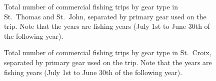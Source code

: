 \documentclass[
  letterpaper,
  oneside,
  open=any]{scrbook}
\begin{document}
\begin{figure}


\caption{\label{fig-gearSTT}Total number of commercial fishing trips by
gear type in St.~Thomas and St.~John, separated by primary gear used on
the trip. Note that the years are fishing years (July 1st to June 30th
of the following year).}

\end{figure}%

\begin{figure}


\caption{\label{fig-gearSTX}Total number of commercial fishing trips by
gear type in St.~Croix, separated by primary gear used on the trip. Note
that the years are fishing years (July 1st to June 30th of the following
year).}

\end{figure}%
\end{document}
